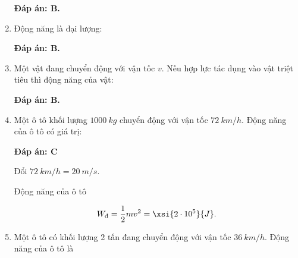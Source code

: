 \begin{enumerate}[label=\bfseries Câu \arabic*:, leftmargin=1.5cm]
	\hideall
	{	
		\textbf{Đáp án: B.}
		
	}
	
	\item {}
	
	
	{Động năng là đại lượng:
	}
	
	\hideall
	{	
		\textbf{Đáp án: B.}
	}
	\item {}
	
	
	{Một vật đang chuyển động với vận tốc $v$. Nếu hợp lực tác dụng vào vật triệt tiêu thì động năng của vật:
	}
	
	\hideall
	{	
		\textbf{Đáp án: B.}
	}
	\item {}
	
	
	{Một ô tô khối lượng $\SI{1000}{kg}$ chuyển động với vận tốc $\SI{72}{km/h}$. Động năng của ô tô có giá trị:
	}
	
	\hideall
	{	
		\textbf{Đáp án: C}
		
		Đổi $\SI{72}{km/h} = \SI{20}{m/s}.$
		
		Động năng của ô tô
		
		$$W_\text{đ} = \dfrac{1}{2}mv^2 = \xsi{2\cdot 10^5}{J}.$$
	}
	\item {}
	
	
	{
		Một ô tô có khối lượng 2 tấn đang chuyển động với vận tốc $\SI{36}{km/h}$. Động năng của ô tô là
	}
	

\end{enumerate}
